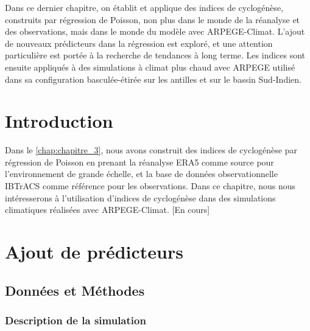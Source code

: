 \documentclass[../main.tex]{subfiles}
\begin{document}
\begin{itshape}
    Dans ce dernier chapitre, on établit et applique des indices de cyclogénèse, construits par régression de Poisson, non plus dans le monde de la réanalyse et
    des observations, mais dans le monde du modèle avec ARPEGE-Climat. L'ajout de nouveaux prédicteurs dans la régression est exploré, et une attention
    particulière est portée à la recherche de tendances à long terme. Les indices sont ensuite appliqués à des simulations à climat plus chaud avec ARPEGE
    utilisé dans sa configuration basculée-étirée sur les antilles et sur le bassin Sud-Indien.
\end{itshape}

\minitoc
\newpage

\section{Introduction}

Dans le \cref{chap:chapitre_3}, nous avons construit des indices de cyclogénèse par régression de Poisson en prenant la réanalyse ERA5 comme source pour
l'environnement de grande échelle, et la base de données observationnelle IBTrACS comme référence pour les observations. Dans ce chapitre, nous nous
intéresserons à l'utilisation d'indices de cyclogénèse dans des simulations climatiques réalisées avec ARPEGE-Climat. [En cours]

\section{Ajout de prédicteurs}

\subsection{Données et Méthodes}

\subsubsection{Description de la simulation}
\end{document}
